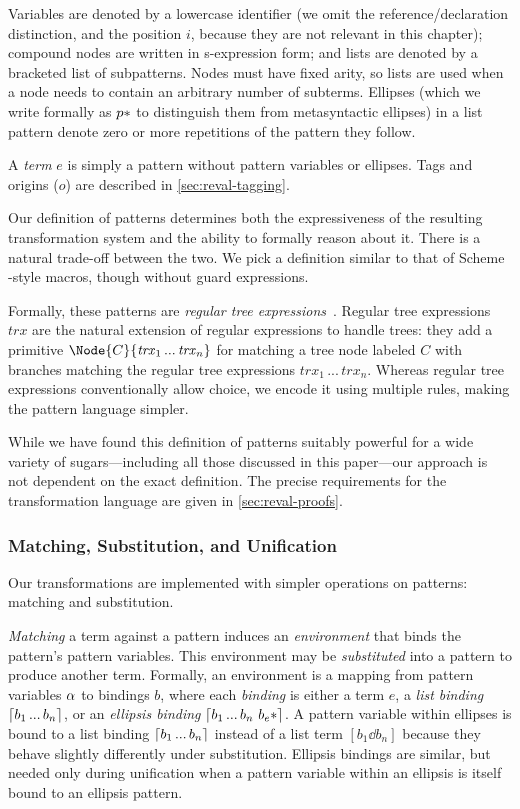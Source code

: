 Variables are denoted by a lowercase
identifier (we omit the reference/declaration distinction, and the
position $i$, because they are not relevant in this chapter);
compound nodes are written in s-expression form;
and lists are denoted by a
bracketed list of subpatterns. Nodes must have fixed arity, so lists are
used when a node needs to contain an arbitrary number of subterms.
Ellipses (which we write formally as $p*$ to distinguish them
from metasyntactic ellipses) in a list pattern denote zero or more
repetitions of the pattern
they follow.

A \emph{term} $e$ is simply a pattern without pattern variables or
ellipses. Tags and origins ($o$) are described in \cref{sec:reval-tagging}.

Our definition of patterns determines both the expressiveness of the
resulting transformation system and the ability to formally reason about
it. There is a natural trade-off between the two. We pick a definition similar to
that of Scheme -style macros, though without guard
expressions.

Formally, these patterns are \emph{regular tree
  expressions}~\cite{regular-tree-expressions}. Regular tree
expressions $\mathit{trx}$ are the natural extension of regular
expressions to handle trees: they add a primitive $\Node{C}{\mathit{trx}_1
\,...\,\mathit{trx}_n}$ for matching a tree node labeled $C$ with
branches matching the regular tree expressions
$\mathit{trx}_1\,...\,\mathit{trx}_n$. Whereas regular tree
expressions conventionally allow choice, we encode it using multiple
rules, making the pattern language simpler.

While we have found this definition of patterns suitably powerful for a
wide variety of sugars---including all those discussed in this paper---our
approach is not dependent on the exact definition. The precise
requirements for the transformation language are given in
\cref{sec:reval-proofs}.



\subsubsection{Matching, Substitution, and Unification}

Our transformations are implemented with simpler operations on patterns:
matching and substitution.

\emph{Matching} a term against a pattern induces an \emph{environment}
that binds the pattern's pattern variables. This environment may be
\emph{substituted} into a pattern to produce another term. Formally, an
environment is a mapping from pattern variables $\alpha$ to bindings $b$,
where each \emph{binding} is either a term $e$, a \emph{list binding}
$\lceil b_1 \,...\, b_n \rceil$, or an \emph{ellipsis binding}
$\lceil b_1 \,...\, b_n\ b_e* \rceil$. A pattern variable within ellipses is
bound to a list binding $\lceil b_1 \,...\, b_n \rceil$ instead of a list term
$[b_1 \dd b_n]$ because they behave slightly differently under
substitution. Ellipsis bindings are similar, but needed only during
unification when a pattern variable within an ellipsis is itself bound to an
ellipsis pattern.

